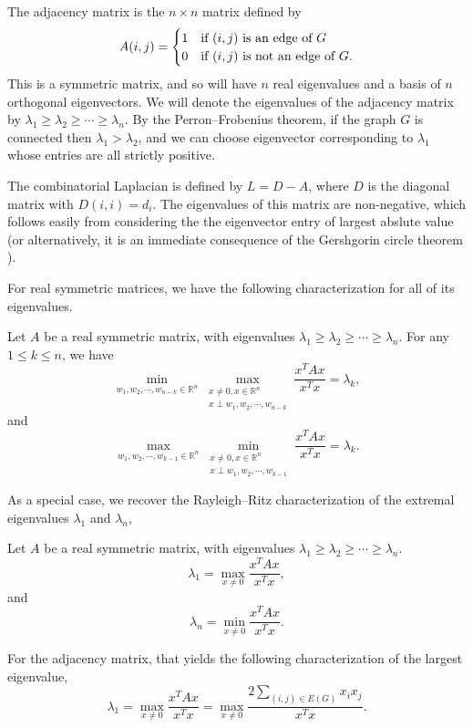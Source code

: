The adjacency matrix is the $n \times n$ matrix defined by
\[
 A(i,j) =
  \begin{cases} 
      \hfill 1 \hfill & \text{if $(i,j)$ is an edge of $G$} \\
      \hfill 0 \hfill & \text{if $(i,j)$ is not an edge of $G$.} \\
  \end{cases}
\]
This is a symmetric matrix, and so will have $n$ real eigenvalues and a basis of
$n$ orthogonal eigenvectors.  We will denote the eigenvalues of the adjacency matrix
by $\lambda_1 \geq \lambda_2 \geq \cdots \geq \lambda_n$.  By the Perron--Frobenius theorem,
if the graph $G$ is connected then $\lambda_1 > \lambda_2$, and we can choose
eigenvector corresponding to $\lambda_1$ whose entries are all strictly positive.


The combinatorial Laplacian is defined by $L = D - A$, where $D$ is the diagonal matrix
with $D(i,i) = d_i$.  The eigenvalues of this matrix are non-negative, which follows
easily from considering the the eigenvector entry of largest abslute value (or alternatively,
it is an immediate consequence of the Gershgorin circle theorem \cite{HornJohnson2012}).  

For real symmetric matrices, we have the following characterization for all of its eigenvalues.
\begin{theorem}
  Let $A$ be a real symmetric matrix, with
   eigenvalues $\lambda_1 \geq \lambda_2 \geq \cdots \geq \lambda_n$.
  For any $1 \leq k \leq n$, we have
  \[ \min_{w_1, w_2, \cdots, w_{n-k} \in \mathbb{R}^n} \max_{\substack{x\neq 0, x \in \mathbb{R}^n\\x \perp w_1, w_2, \cdots, w_{n-k}}} \frac{x^T A x}{x^T x} = \lambda_k, \]
  and
  \[ \max_{w_1, w_2, \cdots, w_{k-1} \in \mathbb{R}^n} \min_{\substack{x\neq 0, x \in \mathbb{R}^n\\x \perp w_1, w_2, \cdots, w_{k-1}}} \frac{x^T A x}{x^T x} = \lambda_k .\]
  
\end{theorem}
\noindent As a special case, we recover the Rayleigh--Ritz characterization of the extremal eigenvalues
$\lambda_1$ and $\lambda_n$,
\begin{theorem}
  Let $A$ be a real symmetric matrix, with
   eigenvalues $\lambda_1 \geq \lambda_2 \geq \cdots \geq \lambda_n$.
  \[ \lambda_1 = \max_{x \neq 0} \frac{x^T A x}{x^T x},\]
  and
  \[ \lambda_n = \min_{x \neq 0} \frac{x^T A x}{x^T x}.\]  
\end{theorem}
\noindent For the adjacency matrix, that yields the following characterization of the largest
eigenvalue,
\[ \lambda_1 = \max_{x \neq 0} \frac{x^T A x}{x^T x} = \max_{x \neq 0} \frac{2\sum_{(i,j) \in E(G)} x_i x_j}{x^T x}.\]



